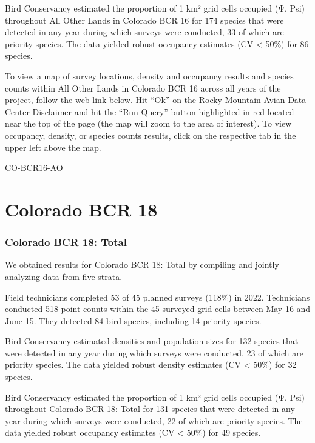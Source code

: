 \documentclass[
  letterpaper,
  DIV=11,
  numbers=noendperiod,
  oneside]{scrreprt}
\begin{document}
Bird Conservancy estimated the proportion of 1 km² grid cells occupied
(Ψ, Psi) throughout All Other Lands in Colorado BCR 16 for 174 species
that were detected in any year during which surveys were conducted, 33
of which are priority species. The data yielded robust occupancy
estimates (CV \textless{} 50\%) for 86 species.

To view a map of survey locations, density and occupancy results and
species counts within All Other Lands in Colorado BCR 16 across all
years of the project, follow the web link below. Hit ``Ok'' on the Rocky
Mountain Avian Data Center Disclaimer and hit the ``Run Query'' button
highlighted in red located near the top of the page (the map will zoom
to the area of interest). To view occupancy, density, or species counts
results, click on the respective tab in the upper left above the map.

\href{http://www.rmbo.org/new_site/adc/QueryWindow.aspx\#N4IgzgLgTghhCuBbEAuABCAwgeQLQCFMAlARgDZcBBbdSgGzrWwgAsBTKNAGRgDsATMCAC+QA===}{CO-BCR16-AO}

\hypertarget{colorado-bcr-18}{%
\section{Colorado BCR 18}\label{colorado-bcr-18}}

\hypertarget{colorado-bcr-18-total}{%
\subsubsection{Colorado BCR 18: Total}\label{colorado-bcr-18-total}}

We obtained results for Colorado BCR 18: Total by compiling and jointly
analyzing data from five strata.

Field technicians completed 53 of 45 planned surveys (118\%) in 2022.
Technicians conducted 518 point counts within the 45 surveyed grid cells
between May 16 and June 15. They detected 84 bird species, including 14
priority species.

Bird Conservancy estimated densities and population sizes for 132
species that were detected in any year during which surveys were
conducted, 23 of which are priority species. The data yielded robust
density estimates (CV \textless{} 50\%) for 32 species.

Bird Conservancy estimated the proportion of 1 km² grid cells occupied
(Ψ, Psi) throughout Colorado BCR 18: Total for 131 species that were
detected in any year during which surveys were conducted, 22 of which
are priority species. The data yielded robust occupancy estimates (CV
\textless{} 50\%) for 49 species.
\end{document}
